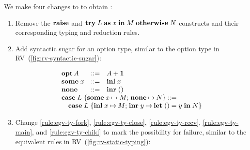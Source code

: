 \documentclass[sigplan,screen,review]{acmart}
\begin{document}
We make four changes to \affineEGV to obtain \affineAGV:
\begin{enumerate}
\item
  Remove the $\gvRaise$ and $\gvTry{L}{x}{M}{N}$ constructs and their corresponding typing and reduction rules.
\item
  Add syntactic sugar for an option type, similar to the option type in RV~(\cref{fig:rv-syntactic-sugar}):
  \\
  \begin{minipage}{1.0\linewidth}
    \[%
      \begin{array}{l}%
        \!\!\!%
        \begin{array}{lcl}%
          \gvTyOpt{A} &::=& \gvTySum{A}{\gvTyUnit}
          \\
          \gvSome{x} &::=& \gvInl{x}
          \\
          \gvNone &::=& \gvInr{\gvUnit}
        \end{array}
        \\
        \gvCaseOpt{L}{x}{M}{N} ::=
        \\
        \quad\gvCaseSum{L}{x}{M}{y}{\gvLetUnit{y}{N}}
      \end{array}
    \]
  \end{minipage}
\item
  Change \ref{rule:egv-ty-fork}, \ref{rule:egv-ty-close}, \ref{rule:egv-ty-recv}, \ref{rule:egv-ty-main}, and \ref{rule:egv-ty-child} to mark the possibility for failure, similar to the equivalent rules in RV~(\cref{fig:rv-static-typing}):
  \begin{center}
    \begin{prooftree}
    \end{prooftree}    
    \begin{prooftree}
    \end{prooftree}
    \begin{prooftree}
    \end{prooftree}
    \begin{prooftree*}

\end{prooftree*}
\end{center}
\end{enumerate}
\end{document}

